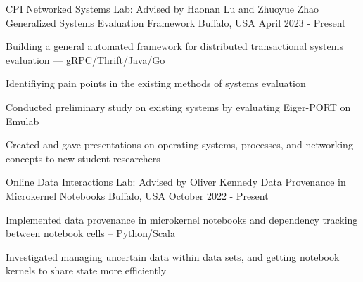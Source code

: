 

\begin{cventries}


  \cventry
    {CPI Networked Systems Lab: Advised by Haonan Lu and Zhuoyue Zhao} %
    {Generalized Systems Evaluation Framework} %
    {Buffalo, USA} %
    {April 2023 - Present} %
    {
      \begin{cvitems} %
        \item Building a general automated framework for distributed transactional systems evaluation --- gRPC/Thrift/Java/Go
        \item Identifiying pain points in the existing methods of systems evaluation
        \item Conducted preliminary study on existing systems by evaluating Eiger-PORT on Emulab
        \item Created and gave presentations on operating systems, processes, and networking concepts to new student researchers
      \end{cvitems}
    }


  \cventry
    {Online Data Interactions Lab: Advised by Oliver Kennedy} %
    {Data Provenance in Microkernel Notebooks} %
    {Buffalo, USA} %
    {October 2022 - Present} %
    {
      \begin{cvitems} %
        \item Implemented data provenance in microkernel notebooks and dependency tracking between notebook cells -- Python/Scala
        \item Investigated managing uncertain data within data sets, and getting notebook kernels to share state more efficiently
      \end{cvitems}
    }

\end{cventries}
